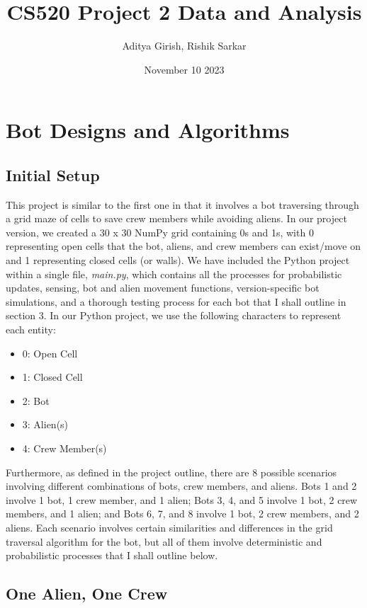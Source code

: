 \documentclass[11pt]{article}
\title{CS520 Project 2 Data and Analysis}
\author{Aditya Girish, Rishik Sarkar}
\date{November 10 2023}
\begin{document}
\maketitle

\section{Bot Designs and Algorithms}

\subsection{Initial Setup}

This project is similar to the first one in that it involves a bot traversing through a grid maze of cells to save crew members while avoiding aliens. In our project version, we created a 30 x 30 NumPy grid containing 0s and 1s, with 0 representing open cells that the bot, aliens, and crew members can exist/move on and 1 representing closed cells (or walls). We have included the Python project within a single file, \emph{main.py}, which contains all the processes for probabilistic updates, sensing, bot and alien movement functions, version-specific bot simulations, and a thorough testing process for each bot that I shall outline in section 3. In our Python project, we use the following characters to represent each entity:

\begin{itemize}
    \item 0: Open Cell
    \item 1: Closed Cell
    \item 2: Bot
    \item 3: Alien(s)
    \item 4: Crew Member(s)
\end{itemize}

Furthermore, as defined in the project outline, there are 8 possible scenarios involving different combinations of bots, crew members, and aliens. Bots 1 and 2 involve 1 bot, 1 crew member, and 1 alien; Bots 3, 4, and 5 involve 1 bot, 2 crew members, and 1 alien; and Bots 6, 7, and 8 involve 1 bot, 2 crew members, and 2 aliens. Each scenario involves certain similarities and differences in the grid traversal algorithm for the bot, but all of them involve deterministic and probabilistic processes that I shall outline below.

\subsection{One Alien, One Crew}
\end{document}
